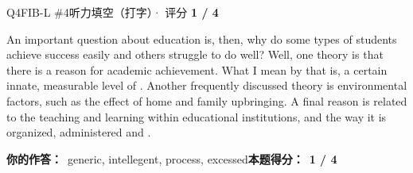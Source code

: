 \begin{qblock}{Q4\quad FIB-L \#4}{听力填空（打字）· 评分 \textcolor{cAccent}{\bfseries 1 / 4}}
\begin{promptbox}
An important question about education is, then, why do some types of students achieve success easily and others struggle to do well? Well, one theory is that there is a  reason for academic achievement. What I mean by that is, a certain innate, measurable level of . Another frequently discussed theory is environmental factors, such as the effect of home and family upbringing. A final reason is related to the teaching and learning  within educational institutions, and the way it is organized, administered and .
\end{promptbox}
\par\smallskip
\textbf{你的作答：}\ {\color{cWrong}generic, intellegent}, process, {\color{cWrong}excessed}\qquad\textbf{本题得分：}\ {\color{cAccent}\bfseries 1 / 4}
\end{qblock}

